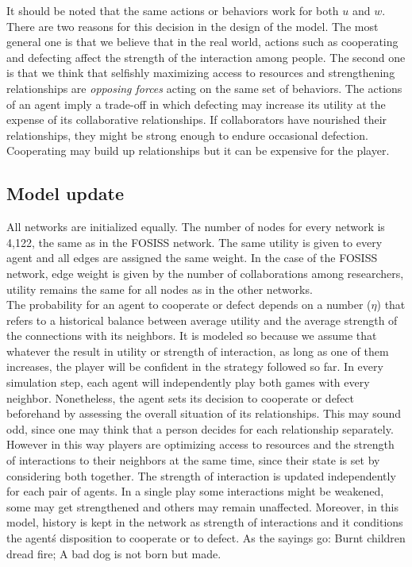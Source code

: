 \documentclass{bmcart}
\begin{document}
It should be noted that the same actions or behaviors work for
  both $u$ and $w$. There are two reasons for this decision in the design of the
model. The most general one is that we believe that in the real world,
actions such as cooperating and defecting affect the strength of the interaction
among people. The second one is that we think that selfishly maximizing access to resources and
strengthening relationships are \emph{opposing forces} acting on the same set of
behaviors. The actions of an agent imply a trade-off in which defecting may
increase its utility at the expense of its collaborative relationships. If
collaborators have nourished their relationships, they might be strong enough to
endure occasional defection. Cooperating may build up relationships but it can be
expensive for the player.

\subsection*{Model update}

All networks are initialized equally. The number of nodes for every
network is 4,122, the same as in the FOSISS network.  The same utility
is given to every agent and all edges are assigned the same weight. In
the case of the FOSISS network, edge weight is given by the number of
collaborations among researchers, utility remains the same for all
nodes as in the other networks.\\

The probability for an agent to cooperate or defect depends on a number ($\eta$)
that refers to a historical balance between average utility and the average
strength of the connections with its neighbors. It is modeled so because we
assume that whatever the result in utility or strength of interaction, as long
as one of them increases, the player will be confident in the strategy followed
so far. {\color{red}In every simulation step, each agent will independently play both games
with every neighbor. Nonetheless, the agent sets its decision to cooperate or
defect beforehand by assessing the overall situation of its relationships. This
may sound odd, since one may think that a person decides for each relationship
separately. However in this way players are optimizing access to resources and
the strength of interactions to their neighbors at the same time, since their
state is set by considering both together. The strength of interaction is
updated independently for each pair of agents.  In a single play some
interactions might be weakened, some may get strengthened and others may remain
unaffected. Moreover, in this model, history is kept in the network as strength
of interactions and it conditions the agent\'s disposition to cooperate or to
defect. As the sayings go: Burnt children dread fire; A bad dog is not born but made.}\\
\end{document}
